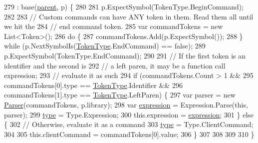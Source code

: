 \begin{DoxyCode}
279                                                                : base(\hyperlink{a00063_af313a82103fcc2ff5a177dbb06b92f7b}{parent}, p) \{
280 
281                 p.ExpectSymbol(TokenType.BeginCommand);
282 
283                 \textcolor{comment}{// Custom commands can have ANY token in them. Read them all until we hit the}
284                 \textcolor{comment}{// end command token.}
285                 var commandTokens = \textcolor{keyword}{new} List<Token>();
286                 \textcolor{keywordflow}{do} \{
287                     commandTokens.Add(p.ExpectSymbol());
288                 \} \textcolor{keywordflow}{while} (p.NextSymbolIs(\hyperlink{a00026_a301aa7c866593a5b625a8fc158bbeace}{TokenType}.EndCommand) == \textcolor{keyword}{false});
289                 p.ExpectSymbol(TokenType.EndCommand);
290 
291                 \textcolor{comment}{// If the first token is an identifier and the second is}
292                 \textcolor{comment}{// a left paren, it may be a function call expression;}
293                 \textcolor{comment}{// evaluate it as such}
294                 \textcolor{keywordflow}{if} (commandTokens.Count > 1 && 
295                     commandTokens[0].type == \hyperlink{a00026_a301aa7c866593a5b625a8fc158bbeace}{TokenType}.Identifier &&
296                     commandTokens[1].type == \hyperlink{a00026_a301aa7c866593a5b625a8fc158bbeace}{TokenType}.LeftParen) \{            
297                     var parser = \textcolor{keyword}{new} \hyperlink{a00064_acd2714b911fb5e7c38f0e07a9dc1af58}{Parser}(commandTokens, p.library);
298                     var \hyperlink{a00032_a4250d192d5b58e2404a14c68eb616f16}{expression} = Expression.Parse(\textcolor{keyword}{this}, parser);
299                     \hyperlink{a00032_a5ef3bc96812be224d91548bfcdfd4b92}{type} = Type.Expression;
300                     this.expression = \hyperlink{a00032_a4250d192d5b58e2404a14c68eb616f16}{expression};
301                 \} \textcolor{keywordflow}{else} \{
302                     \textcolor{comment}{// Otherwise, evaluate it as a command}
303                     \hyperlink{a00032_a5ef3bc96812be224d91548bfcdfd4b92}{type} = Type.ClientCommand;
304 
305                     this.clientCommand = commandTokens[0].value;
306                 \}
307 
308 
309 
310             \}
\end{DoxyCode}


